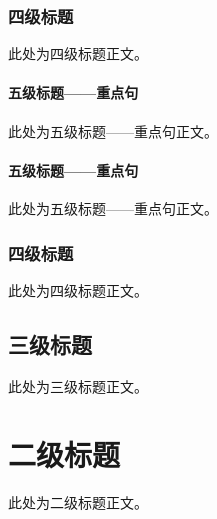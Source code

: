 \subsubsection{四级标题}
此处为四级标题正文。
\paragraph{五级标题——重点句}
此处为五级标题——重点句正文。
\paragraph{五级标题——重点句}
此处为五级标题——重点句正文。
\subsubsection{四级标题}
此处为四级标题正文。
\subsection{三级标题}
此处为三级标题正文。
\section{二级标题}
此处为二级标题正文。
